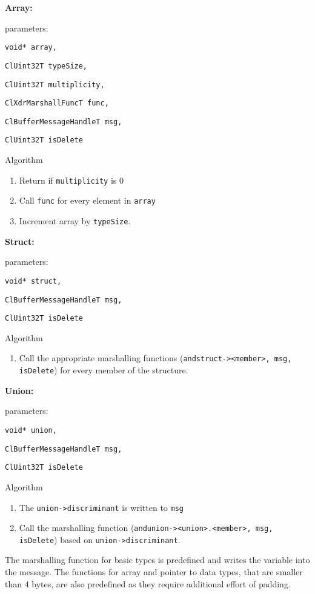 \begin{flushleft}
\textbf{Array:}\par
parameters:\par
{\tt{void* array,}}\par
{\tt{ClUint32T typeSize,}}\par
{\tt{ClUint32T multiplicity,}}\par
{\tt{ClXdrMarshallFuncT func,}}\par
{\tt{ClBufferMessageHandleT msg,}}\par
{\tt{ClUint32T isDelete}}\par
Algorithm
\begin{enumerate}
\item
Return if {\tt{multiplicity}} is 0
\item
Call {\tt{func}} for every element in {\tt{array}}
\item
Increment array by {\tt{typeSize}}.
\end{enumerate}

\textbf{Struct:}\par
parameters:\par
{\tt{void* struct,}}\par
{\tt{ClBufferMessageHandleT msg,}}\par
{\tt{ClUint32T isDelete}}\par
Algorithm
\begin{enumerate}
\item
Call the appropriate marshalling functions ({\tt{andstruct-><member>, msg, isDelete}}) for every member of the structure. 
\end{enumerate}

\textbf{Union:}\par
parameters:\par
{\tt{void* union,}}\par
{\tt{ClBufferMessageHandleT msg,}}\par
{\tt{ClUint32T isDelete}}\par
Algorithm
\begin{enumerate}
\item
The {\tt{union->discriminant}} is written to {\tt{msg}}
\item
Call the marshalling function ({\tt{andunion-><union>.<member>, msg, isDelete}}) based on {\tt{union->discriminant}}.
\end{enumerate}

The marshalling function for basic types is predefined and writes the variable into the message. The functions for array and pointer to data types, that 
are smaller than 4 bytes, are also predefined as they require additional effort of padding.


\end{flushleft}
